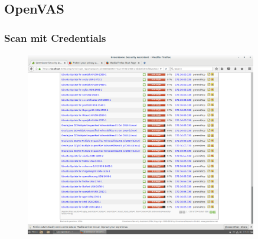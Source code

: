 \documentclass[12pt]{article}
\theoremstyle{plain}
\begin{document}
\subsection*{OpenVAS}
\subsubsection*{Scan mit Credentials}
\begin{figure}[!ht]
	\centering
     \includegraphics[width=0.9\textwidth]{Bilder/openvas_with_credentials.png}
\end{figure}
\end{document}
